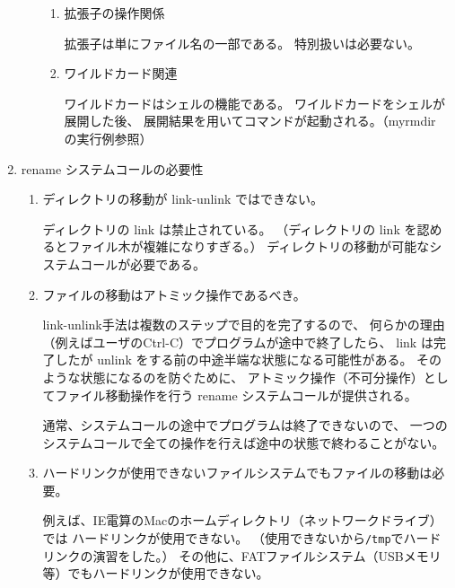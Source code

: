 \documentclass[a4j,twcolumn,11pt,nomag]{ltjarticle}      %
\begin{document}
\begin{enumerate}
\begin{enumerate}
\begin{enumerate}
\item 拡張子の操作関係

拡張子は単にファイル名の一部である。
特別扱いは必要ない。

\item ワイルドカード関連

ワイルドカードはシェルの機能である。
ワイルドカードをシェルが展開した後、
展開結果を用いてコマンドが起動される。（myrmdir の実行例参照）

\end{enumerate}
\end{enumerate}

\item rename システムコールの必要性

\begin{enumerate}
\item ディレクトリの移動が link-unlink ではできない。

ディレクトリの link は禁止されている。
（ディレクトリの link を認めるとファイル木が複雑になりすぎる。）
ディレクトリの移動が可能なシステムコールが必要である。

\item ファイルの移動はアトミック操作であるべき。

link-unlink手法は複数のステップで目的を完了するので、
何らかの理由（例えばユーザのCtrl-C）でプログラムが途中で終了したら、
link は完了したが unlink をする前の中途半端な状態になる可能性がある。
そのような状態になるのを防ぐために、
アトミック操作（不可分操作）としてファイル移動操作を行う
rename システムコールが提供される。

通常、システムコールの途中でプログラムは終了できないので、
一つのシステムコールで全ての操作を行えば途中の状態で終わることがない。

\item ハードリンクが使用できないファイルシステムでもファイルの移動は必要。

例えば、IE電算のMacのホームディレクトリ（ネットワークドライブ）では
ハードリンクが使用できない。
（使用できないから\texttt{/tmp}でハードリンクの演習をした。）
その他に、FATファイルシステム（USBメモリ等）でもハードリンクが使用できない。


\end{enumerate}
\end{enumerate}
\end{document}
